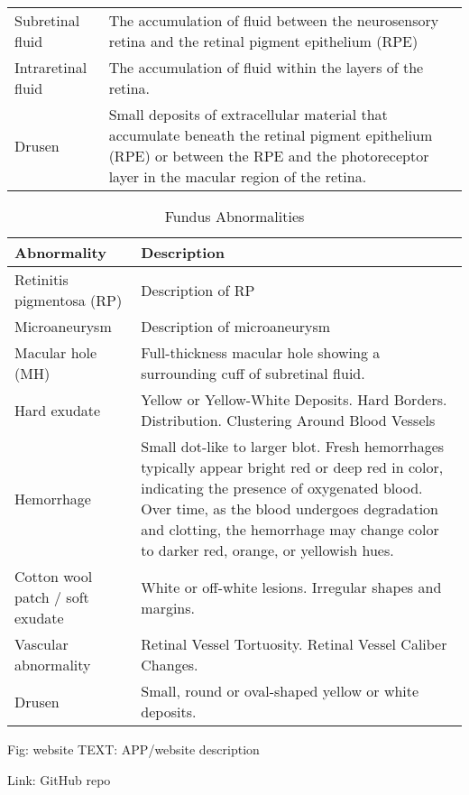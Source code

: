 \documentclass{article}
\begin{document}
{{\begin{longtable}{lp{3.8in}}
				\multicolumn{1}{l}{Subretinal fluid}
				&  The accumulation of fluid between the neurosensory retina and the retinal pigment epithelium (RPE)\\
				
				\multicolumn{1}{l}{Intraretinal fluid}
				& The accumulation of fluid within the layers of the retina.\\
				
				\multicolumn{1}{l}{Drusen}
				& Small deposits of extracellular material that accumulate beneath the retinal pigment epithelium (RPE) or between the RPE and the photoreceptor layer in the macular region of the retina.\\
				
				\bottomrule
			\end{longtable}
		}
	}
	
	{
		\fontsize{9}{12}\selectfont
		{
			\begin{longtable}{lp{3.8in}}
				\caption{Fundus Abnormalities}
				\label{tb:fundus-ab}\\
				\toprule
				Abnormality&Description\\
				\toprule
				
				\multicolumn{1}{l}{Retinitis pigmentosa (RP)}
				& Description of RP\\
				
				\multicolumn{1}{l}{Microaneurysm}
				& Description of microaneurysm\\
				
				\multicolumn{1}{l}{Macular hole (MH)} & Full-thickness macular hole showing a surrounding cuff of subretinal fluid.\\
				
				\multicolumn{1}{l}{Hard exudate} & Yellow or Yellow-White Deposits.  Hard Borders.  Distribution.  Clustering Around Blood Vessels\\
				
				\multicolumn{1}{l}{Hemorrhage} & Small dot-like to larger blot.  Fresh hemorrhages typically appear bright red or deep red in color, indicating the presence of oxygenated blood. Over time, as the blood undergoes degradation and clotting, the hemorrhage may change color to darker red, orange, or yellowish hues.\\
				
				\multicolumn{1}{l}{Cotton wool patch / soft exudate} & White or off-white lesions.  Irregular shapes and margins.\\
				
				\multicolumn{1}{l}{Vascular abnormality} & Retinal Vessel Tortuosity.  Retinal Vessel Caliber Changes.  \\
				
				\multicolumn{1}{l}{Drusen} & Small, round or oval-shaped yellow or white deposits.\\
				
				\bottomrule
			\end{longtable}
		}
	}
	
	
	Fig: website
	TEXT: APP/website description
	
	Link: GitHub repo
	
\end{document}
